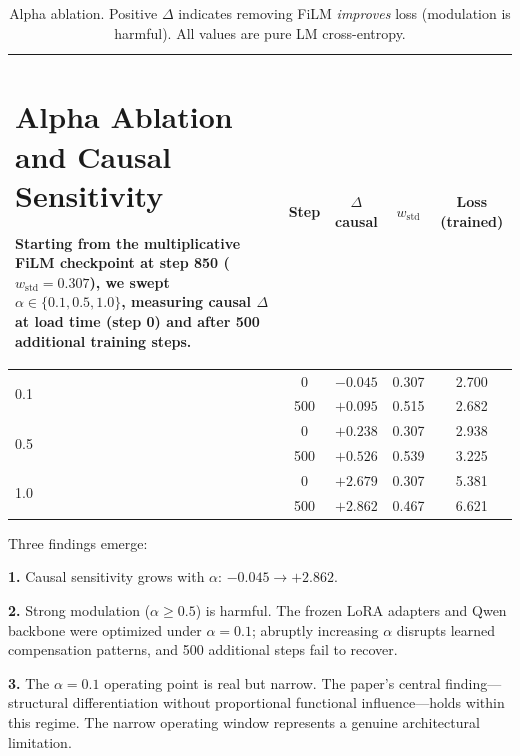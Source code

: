 \documentclass[11pt,a4paper]{article}
\begin{document}
\begin{table}[h]
\begin{tabular}{lcccc}
\section{Alpha Ablation and Causal Sensitivity}
\label{app:alpha}

Starting from the multiplicative FiLM checkpoint at step 850 ($w_\mathrm{std} =
0.307$), we swept $\alpha \in \{0.1, 0.5, 1.0\}$, measuring causal $\Delta$ at
load time (step 0) and after 500 additional training steps.

\begin{table}[h]
\centering
\begin{tabular}{lcccc}
\toprule
$\alpha$ & \textbf{Step} & $\Delta$ \textbf{causal} & $w_\mathrm{std}$ & \textbf{Loss (trained)} \\
\midrule
\multirow{2}{*}{0.1} & 0   & $-0.045$ & 0.307 & 2.700 \\
                     & 500 & $+0.095$ & 0.515 & 2.682 \\
\midrule
\multirow{2}{*}{0.5} & 0   & $+0.238$ & 0.307 & 2.938 \\
                     & 500 & $+0.526$ & 0.539 & 3.225 \\
\midrule
\multirow{2}{*}{1.0} & 0   & $+2.679$ & 0.307 & 5.381 \\
                     & 500 & $+2.862$ & 0.467 & 6.621 \\
\bottomrule
\end{tabular}
\caption{Alpha ablation. Positive $\Delta$ indicates removing FiLM \emph{improves}
loss (modulation is harmful). All values are pure LM cross-entropy.}
\end{table}

Three findings emerge:

\textbf{1.} Causal sensitivity grows with $\alpha$: $-0.045 \to +2.862$.

\textbf{2.} Strong modulation ($\alpha \geq 0.5$) is harmful. The frozen LoRA
adapters and Qwen backbone were optimized under $\alpha = 0.1$; abruptly increasing
$\alpha$ disrupts learned compensation patterns, and 500 additional steps fail to
recover.

\textbf{3.} The $\alpha = 0.1$ operating point is real but narrow. The paper's
central finding---structural differentiation without proportional functional
influence---holds within this regime. The narrow operating window represents a
genuine architectural limitation.
\end{document}
